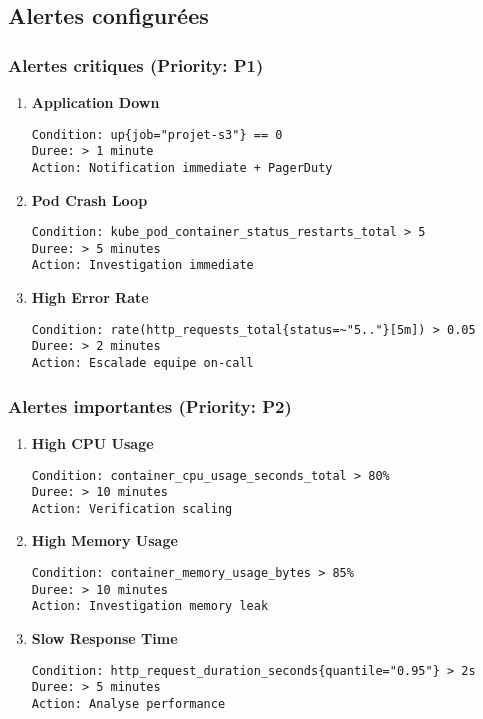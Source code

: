 \documentclass[12pt,a4paper]{article}
\begin{document}
\subsection{Alertes configurées}

\subsubsection{Alertes critiques (Priority: P1)}

\begin{enumerate}
    \item \textbf{Application Down}
    \begin{lstlisting}
Condition: up{job="projet-s3"} == 0
Duree: > 1 minute
Action: Notification immediate + PagerDuty
    \end{lstlisting}
    
    \item \textbf{Pod Crash Loop}
    \begin{lstlisting}
Condition: kube_pod_container_status_restarts_total > 5
Duree: > 5 minutes
Action: Investigation immediate
    \end{lstlisting}
    
    \item \textbf{High Error Rate}
    \begin{lstlisting}
Condition: rate(http_requests_total{status=~"5.."}[5m]) > 0.05
Duree: > 2 minutes
Action: Escalade equipe on-call
    \end{lstlisting}
\end{enumerate}

\subsubsection{Alertes importantes (Priority: P2)}

\begin{enumerate}
    \item \textbf{High CPU Usage}
    \begin{lstlisting}
Condition: container_cpu_usage_seconds_total > 80%
Duree: > 10 minutes
Action: Verification scaling
    \end{lstlisting}
    
    \item \textbf{High Memory Usage}
    \begin{lstlisting}
Condition: container_memory_usage_bytes > 85%
Duree: > 10 minutes
Action: Investigation memory leak
    \end{lstlisting}
    
    \item \textbf{Slow Response Time}
    \begin{lstlisting}
Condition: http_request_duration_seconds{quantile="0.95"} > 2s
Duree: > 5 minutes
Action: Analyse performance
    \end{lstlisting}
\end{enumerate}
\end{document}
